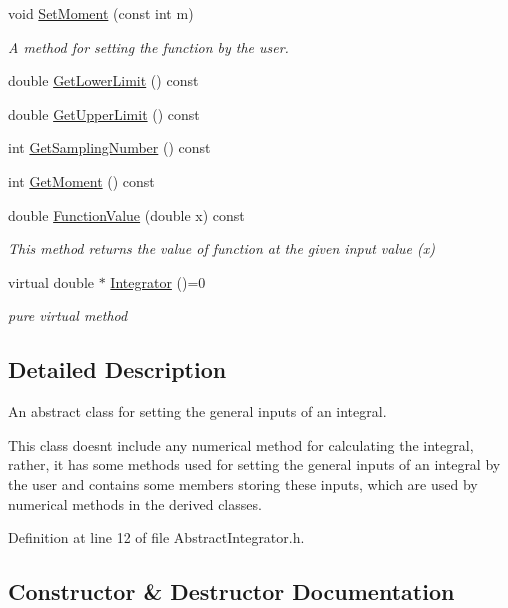 \begin{DoxyCompactItemize}
void \hyperlink{class_abstract_integrator_a871fa27363ee09b98c964ccaa33da100}{Set\+Moment} (const int m)
\begin{DoxyCompactList}\small\item\em A method for setting the function by the user. \end{DoxyCompactList}\item 
double \hyperlink{class_abstract_integrator_ae27a09d1e3fb0a30ce9545a4d8f29cad}{Get\+Lower\+Limit} () const
\item 
double \hyperlink{class_abstract_integrator_a864fe7dc9aa1ff0b36da0b8f361a5b69}{Get\+Upper\+Limit} () const
\item 
int \hyperlink{class_abstract_integrator_ac58629ec6822b3beeefdd1323b627704}{Get\+Sampling\+Number} () const
\item 
int \hyperlink{class_abstract_integrator_a7f709ab302dfe70b5f0f2ce80456fcdb}{Get\+Moment} () const
\item 
double \hyperlink{class_abstract_integrator_a6262731b81f3ad7e984ba354b4601356}{Function\+Value} (double x) const
\begin{DoxyCompactList}\small\item\em This method returns the value of function at the given input value (x) \end{DoxyCompactList}\item 
virtual double $\ast$ \hyperlink{class_abstract_integrator_a073d8f87239f732b3d2832070caa3b17}{Integrator} ()=0
\begin{DoxyCompactList}\small\item\em pure virtual method \end{DoxyCompactList}\end{DoxyCompactItemize}


\subsection{Detailed Description}
An abstract class for setting the general inputs of an integral. 

This class doesn\textquotesingle{}t include any numerical method for calculating the integral, rather, it has some methods used for setting the general inputs of an integral by the user and contains some members storing these inputs, which are used by numerical methods in the derived classes. 

Definition at line 12 of file Abstract\+Integrator.\+h.



\subsection{Constructor \& Destructor Documentation}
\mbox{\label{class_abstract_integrator_aa88168bae2057a179c9ecc2ba9639f61}} 
